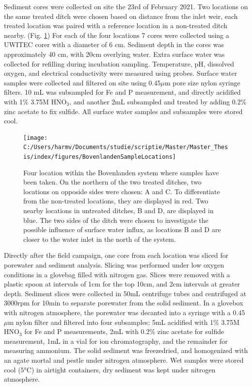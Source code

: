 \documentclass[a4paper,11pt]{article}
\begin{document}
Sediment cores were collected on site the 23rd of February 2021. Two locations on the same treated ditch were chosen based on distance from the inlet weir, each treated location was paired with a reference location in a non-treated ditch nearby. (Fig. \ref{fig:sampleloc}) For each of the four locations 7 cores were collected using a UWITEC corer with a diameter of 6 cm. Sediment depth in the cores was approximately 40 cm, with 20cm overlying water. Extra surface water was collected for refilling during incubation sampling. Temperature, pH, dissolved oxygen, and electrical conductivity were measured using probes. Surface water samples were collected and filtered on site using 0.45\(\mu\)m pore size nylon syringe filters. 10 mL was subsampled for Fe and P measurement, and directly acidified with 1\% 3.75M HNO\(_3\), and another 2mL subsampled and treated by adding 0.2\% zinc acetate to fix sulfide. All surface water samples and subsamples were stored cool.
\begin{figure}

{\centering \texttt{[image: C:/Users/harmv/Documents/studie/scriptie/Master/Master\_Thesis/index/figures/BovenlandenSampleLocations]} 

}

\caption{Four location within the Bovenlanden system where samples have been taken. On the northern of the two treated ditches, two locations on opposide sides were chosen: A and C. To differentiate from the non-treated locations, they are displayed in red. Two nearby locations in untreated ditches, B and D, are displayed in blue. The two sides of the ditch were chosen to investigate the possible influence of surface water influx, as locations B and D are closer to the water inlet in the north of the system. }\label{fig:sampleloc}
\end{figure}
Directly after the field campaign, one core from each location was sliced for porewater and sediment analysis. Slicing was performed under low oxygen conditions in a glovebag filled with nitrogen gas. Slices were removed with a plastic spoon at intervals of 1cm for the top 10cm, and 2cm intervals at greater depth. Sediment slices were collected in 50mL centrifuge tubes and centrifuged at 3000rpm for 10min to separate porewater from the solid sediment. In a glovebox with nitrogen atmosphere, the porewater was decanted into a syringe with a 0.45\(\mu\)m nylon filter and filtered into four subsamples: 5mL acidified with 1\% 3.75M HNO\(_3\) for Fe and P measurements, 2mL with 0.2\% zinc acetate for sulfide measurement, 1mL in a vial for ion chromatography, and the remainder for measuring ammonium. The solid sediment was freezedried, and homogenized with an agate mortal and pestle under nitrogen atmosphere. Wet samples were stored cool (5°C) in airtight containers, dry sediment was kept under nitrogen atmosphere.
\end{document}
